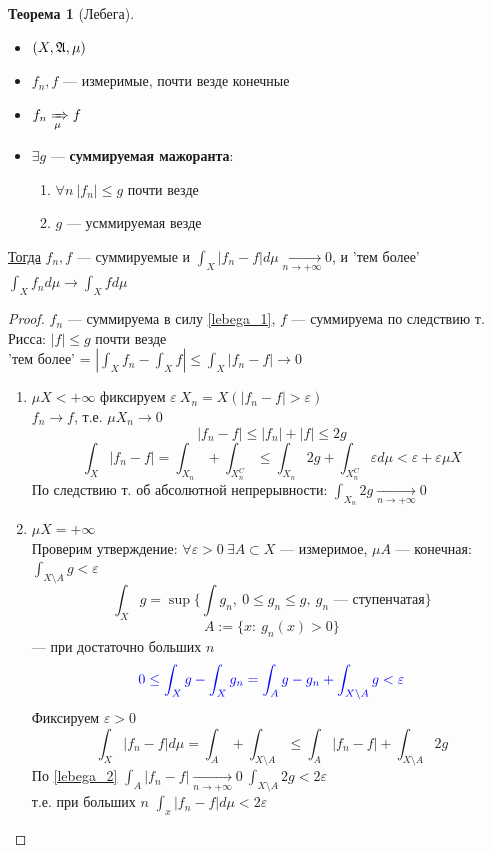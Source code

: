 \documentclass[oneside]{book}
\theoremstyle{plain}
\theoremstyle{remark}
\theoremstyle{definition}
\newtheorem{theorem}{Теорема}[section]
\begin{document}
\begin{theorem}[Лебега]
\-
\begin{itemize}
\item \((X, \mathfrak{A}, \mu)\)
\item \(f_n, f\) --- измеримые, почти везде конечные
\item \(f_n \xRightarrow[\mu]{} f\)
\item \(\exists g\) --- \textbf{суммируемая мажоранта}:
\begin{enumerate}
\item \label{lebega_1} \(\forall n\ |f_n| \le g\) почти везде
\item \(g\) --- усммируемая везде
\end{enumerate}
\end{itemize}
\uline{Тогда} \(f_n, f\) --- суммируемые и \(\int_X |f_n - f|d\mu\xrightarrow[n \to + \infty]{}0\), и 'тем более' \(\int_X f_n d\mu \to \int_X f d\mu\)
\end{theorem}
\begin{proof}
\(f_n\) --- суммируема в силу \ref{lebega_1}, \(f\) --- суммируема по следствию т. Рисса: \(|f| \le g\) почти везде \\
'тем более' = \(\left|\int_X f_n - \int_X f \right| \le \int_X |f_n - f| \to 0\)
\begin{enumerate}
\item \label{lebega_2} \(\mu X < + \infty\) фиксируем \(\varepsilon\ X_n = X(|f_n - f| > \varepsilon)\) \\
\(f_n \to f\), т.е. \(\mu X_n \to 0\)
\[ |f_n - f| \le |f_n| + |f| \le 2g \]
\[ \int_X|f_n - f| = \int_{X_n}+\int_{X_n^C} \le \int_{X_n} 2g + \int_{X_n^C} \varepsilon d\mu < \varepsilon + \varepsilon \mu X\]
По следствию т. об абсолютной непрерывности: \(\int_{X_n} 2g \xrightarrow[n \to + \infty]{} 0\)
\item \(\mu X = + \infty\) \\
Проверим утверждение: \(\forall \varepsilon > 0\ \exists A \subset X\) --- измеримое, \(\mu A\) --- конечная: \(\int_{X\setminus A} g < \varepsilon\)
\[ \int_X g = \sup \{\int g_n,\ 0\le g_n\le g,\ g_n\text{ --- ступенчатая}\} \]
\[ A := \{x:\ g_n(x) > 0\} \]
--- при достаточно больших \(n\)
\[\color{blue} 0 \le \int_X g - \int_X g_n = \int_A g- g_n + \int_{X\setminus A}g < \varepsilon \]
Фиксируем \(\varepsilon > 0\)
\[ \int_X |f_n - f| d\mu = \int_A + \int_{X\setminus A} \le \int_A |f_n -f| + \int_{X\setminus A}2g \]
По \ref{lebega_2} \(\int_A|f_n - f| \xrightarrow[n \to + \infty]{} 0\ \int_{X\setminus A}2g < 2\varepsilon\) \\
т.е. при больших \(n\) \(\int_x |f_n -f|d\mu < 2\varepsilon\)
\end{enumerate}
\end{proof}
\end{document}
